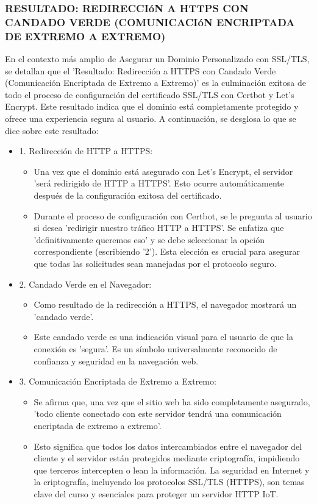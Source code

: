 \documentclass{report}
\begin{document}
\subsubsection{RESULTADO: REDIRECCIóN A HTTPS CON CANDADO VERDE (COMUNICACIóN ENCRIPTADA DE EXTREMO A EXTREMO)}
En el contexto más amplio de Asegurar un Dominio Personalizado con SSL/TLS, se  detallan que el 'Resultado: Redirección a 
HTTPS con Candado Verde (Comunicación Encriptada de Extremo a Extremo)' es la culminación exitosa de todo el proceso de configuración 
del certificado SSL/TLS con Certbot y Let's Encrypt. Este resultado indica que el dominio está completamente protegido y ofrece una 
experiencia segura al usuario.
A continuación, se desglosa lo que se  dice sobre este resultado:
\begin{itemize}
    \item 1. Redirección de HTTP a HTTPS:
        \begin{itemize}
            \item Una vez que el dominio está asegurado con Let's Encrypt, el servidor 'será redirigido de HTTP a HTTPS'. Esto ocurre 
            automáticamente después de la configuración exitosa del certificado.
            \item Durante el proceso de configuración con Certbot, se le pregunta al usuario si desea 'redirigir nuestro tráfico HTTP a HTTPS'. 
            Se enfatiza que 'definitivamente queremos eso' y se debe seleccionar la opción correspondiente (escribiendo '2'). 
            Esta elección es crucial para asegurar que todas las solicitudes sean manejadas por el protocolo seguro.
        \end{itemize}
    \item 2. Candado Verde en el Navegador:
        \begin{itemize}
            \item Como resultado de la redirección a HTTPS, el navegador mostrará un 'candado verde'.
            \item Este candado verde es una indicación visual para el usuario de que la conexión es 'segura'. Es un símbolo universalmente 
            reconocido de confianza y seguridad en la navegación web.
        \end{itemize}
    \item 3. Comunicación Encriptada de Extremo a Extremo:
        \begin{itemize}
            \item Se afirma que, una vez que el sitio web ha sido completamente asegurado, 'todo cliente conectado con 
            este servidor tendrá una comunicación encriptada de extremo a extremo'.
            \item Esto significa que todos los datos intercambiados entre el navegador del cliente y el servidor están protegidos 
            mediante criptografía, impidiendo que terceros intercepten o lean la información. La seguridad en Internet y la criptografía, 
            incluyendo los protocolos SSL/TLS (HTTPS), son temas clave del curso y esenciales para proteger un servidor HTTP IoT.
        \end{itemize}
\end{itemize}
\end{document}
